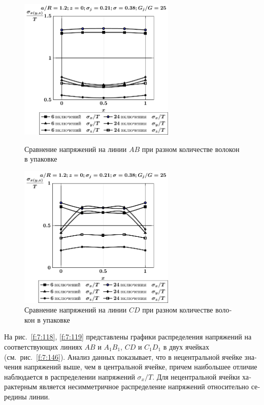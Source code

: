 \begin{russian}
\begin{figure}[h!]
\centering\footnotesize
\parbox[b]{7.5cm}{\centering\includegraphics[width=7.5cm]{inc24-6-a12-h10-r10-g25-z0.pdf}
\caption{Сравнение напряжений на линии $AB$ при разном количестве волокон в упаковке
\label{f:7:116}}}\hfil\hfil
\parbox[b]{7.5cm}{\centering\includegraphics[width=7.5cm]{inc24-6-a12-h10-r10-g25-z0-diag.pdf}
\caption{Сравнение напряжений на линии $CD$ при разном количестве волокон в упаковке
\label{f:7:117}}}
\end{figure}

На рис.~\ref{f:7:118}, \ref{f:7:119} представлены графики распределения напряжений на соответствующих линиях $AB$ и $A_1B_1$, $CD$ и $C_1D_1$ в двух ячейках (см.~рис.~\ref{f:7:146}). Анализ данных показывает, что в нецентральной ячейке значения напряжений выше, чем в центральной ячейке, причем наибольшее отличие наблюдается в распределении напряжений $\sigma_x/T$. Для нецентральной ячейки характерным является несимметричное распределение напряжений относительно середины линии.


\end{russian}
